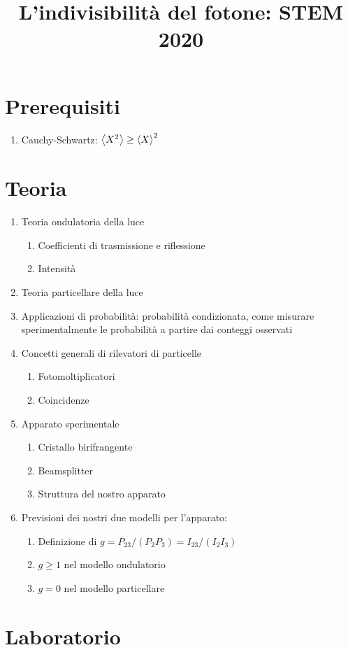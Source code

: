 \documentclass{article}
\title{L'indivisibilità del fotone: STEM 2020}
\begin{document}
\maketitle

\section{Prerequisiti}

\begin{enumerate}
    \item Cauchy-Schwartz: \(\expval{X^2} \geq \expval{X}^2 \)
\end{enumerate}

\section{Teoria}

\begin{enumerate}
    \item Teoria ondulatoria della luce
    \begin{enumerate}
        \item Coefficienti di trasmissione e riflessione
        \item Intensità
    \end{enumerate}
    \item Teoria particellare della luce
    \item Applicazioni di probabilità: probabilità condizionata, come misurare sperimentalmente le probabilità a partire dai conteggi osservati
    \item Concetti generali di rilevatori di particelle
    \begin{enumerate}
        \item Fotomoltiplicatori
        \item Coincidenze
    \end{enumerate}
    \item Apparato sperimentale
    \begin{enumerate}
        \item Cristallo birifrangente
        \item Beamsplitter
        \item Struttura del nostro apparato
    \end{enumerate}
    \item Previsioni dei nostri due modelli per l'apparato:
    \begin{enumerate}
        \item Definizione di \(g = P_{23}/(P_2 P_3) = I_{23}/(I_2 I_3)\)
        \item \(g \geq 1\) nel modello ondulatorio
        \item \(g = 0\) nel modello particellare
    \end{enumerate}
\end{enumerate}



\section{Laboratorio}
\end{document}
